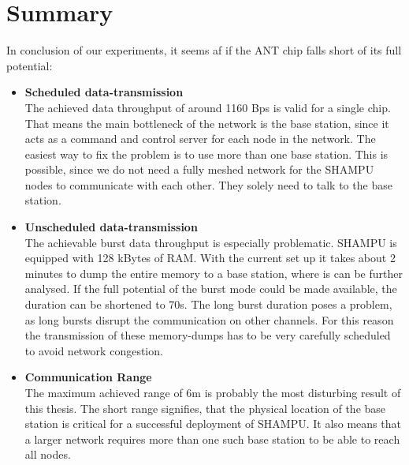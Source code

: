 \section{Summary}
In conclusion of our experiments, it seems af if the ANT chip falls short of its full potential:
\begin{itemize}
	\item{\textbf{Scheduled data-transmission}} \hfill \\ The achieved data throughput of around 1160 Bps is valid for a single chip. That means the main bottleneck of the network is the base station, since it acts as a command and control server for each node in the network. The easiest way to fix the problem is to use more than one base station. This is possible, since we do not need a fully meshed network for the SHAMPU nodes to communicate with each other. They solely need to talk to the base station.
	
	\item{\textbf{Unscheduled data-transmission}} \hfill \\ The achievable burst data throughput is especially problematic. SHAMPU is equipped with 128 kBytes of RAM. With the current set up it takes about 2 minutes to dump the entire memory to a base station, where is can be further analysed. If the full potential of the burst mode could be made available, the duration can be shortened to 70s. The long burst duration poses a problem, as long bursts disrupt the communication on other channels. For this reason the transmission of these memory-dumps has to be very carefully scheduled to avoid network congestion.
	
	\item{\textbf{Communication Range}} \hfill \\ The maximum achieved range of 6m is probably the most disturbing result of this thesis. The short range signifies, that the physical location of the base station is critical for a successful deployment of SHAMPU. It also means that a larger network requires more than one such base station to be able to reach all nodes.
\end{itemize}


